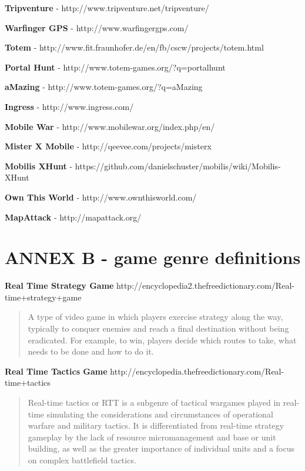 \documentclass{article}
\begin{document}
\textbf{Tripventure} - http://www.tripventure.net/tripventure/ \newline

\textbf{Warfinger GPS} - http://www.warfingergps.com/ \newline

\textbf{Totem} - http://www.fit.fraunhofer.de/en/fb/cscw/projects/totem.html
\newline

\textbf{Portal Hunt} - http://www.totem-games.org/?q=portalhunt \newline

\textbf{aMazing} - http://www.totem-games.org/?q=aMazing \newline

\textbf{Ingress} - http://www.ingress.com/ \newline

\textbf{Mobile War} - http://www.mobilewar.org/index.php/en/ \newline

\textbf{Mister X Mobile} - http://qeevee.com/projects/misterx \newline

\textbf{Mobilis XHunt} - https://github.com/danielschuster/mobilis/wiki/Mobilis-XHunt
\newline

\textbf{Own This World} - http://www.ownthisworld.com/ \newline

\textbf{MapAttack} - http://mapattack.org/ \newline



\section{ANNEX B - game genre definitions}


\textbf{Real Time Strategy Game}		
http://encyclopedia2.thefreedictionary.com/Real-time+strategy+game
\begin{quote}
A type of video game in which players exercise strategy along the way, typically
to conquer enemies and reach a final destination without being eradicated. For
example, to win, players decide which routes to take, what needs to be done and
how to do it.
\end{quote}

\textbf{Real Time Tactics Game}
	http://encyclopedia.thefreedictionary.com/Real-time+tactics
\begin{quote}
Real-time tactics or RTT is a subgenre of tactical wargames played in real-time
simulating the considerations and circumstances of operational warfare and
military tactics. It is differentiated from real-time strategy gameplay by the
lack of resource micromanagement and base or unit building, as well as the
greater importance of individual units and a focus on complex battlefield
tactics.
\end{quote}
\end{document}

